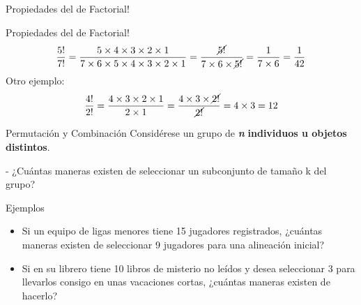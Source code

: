 \documentclass[11pt]{beamer}
\begin{document}
          \begin{frame}{Propiedades del de Factorial!}

            \begin{block}{Propiedades del de Factorial!}
               $$\dfrac{5!}{7!} = \dfrac{5 \times 4 \times 3 \times 2 \times 1}{7 \times 6 \times 5 \times 4 \times 3 \times 2 \times 1} = \dfrac{\cancel{5!}}{7 \times 6 \times \cancel{5!}} = \dfrac{1}{7 \times 6} = \dfrac{1}{42}$$
               Otro ejemplo:\\
               \pause
               $$\dfrac{4!}{2!} = \dfrac{4 \times 3 \times 2 \times 1}{2 \times 1} = \dfrac{4 \times 3 \times \cancel{2!}}{\cancel{2!}} = 4 \times 3 = 12$$
            \end{block}
          \end{frame}

          \begin{frame}{Permutación y Combinación}
              Considérese un grupo de \textbf{\textit{n}}\textbf{ individuos u objetos distintos}.

              - ¿Cuántas maneras existen de seleccionar un subconjunto de tamaño k del grupo?\\
              \pause
              \begin{block}{Ejemplos}
                 \begin{itemize}
                     \item Si un equipo de ligas menores tiene 15 jugadores registrados, ¿cuántas maneras existen de seleccionar 9 jugadores para una alineación inicial?
                     \item Si en su librero tiene 10 libros de misterio no leídos y desea seleccionar 3 para llevarlos consigo en unas vacaciones cortas, ¿cuántas maneras existen de hacerlo?
                 \end{itemize}
              \end{block}
          \end{frame}
\end{document}
